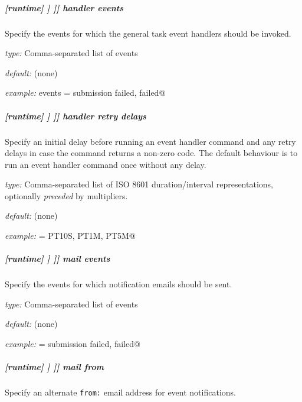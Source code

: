 \subparagraph[handler events]{[runtime] \textrightarrow [[\_\_NAME\_\_]] \textrightarrow [[[events]]] \textrightarrow handler events}

Specify the events for which the general task event handlers should be invoked.

\begin{myitemize}
    \item {\em type:} Comma-separated list of events
    \item {\em default:} (none)
    \item {\em example:} \lstinline@handler events = submission failed, failed@
\end{myitemize}

\subparagraph[handler retry delays]{[runtime] \textrightarrow [[\_\_NAME\_\_]] \textrightarrow [[[events]]] \textrightarrow handler retry delays}
\label{runtime-events-handler-retry-delays}

Specify an initial delay before running an event handler command and any retry
delays in case the command returns a non-zero code. The default behaviour is to
run an event handler command once without any delay.

\begin{myitemize}
    \item {\em type:} Comma-separated list of ISO 8601 duration/interval representations, optionally {\em preceded} by multipliers.
    \item {\em default:} (none)
    \item {\em example:} \lstinline@handler = PT10S, PT1M, PT5M@
\end{myitemize}

\subparagraph[mail events]{[runtime] \textrightarrow [[\_\_NAME\_\_]] \textrightarrow [[[events]]] \textrightarrow mail events}

Specify the events for which notification emails should be sent.

\begin{myitemize}
    \item {\em type:} Comma-separated list of events
    \item {\em default:} (none)
    \item {\em example:} \lstinline@handler = submission failed, failed@
\end{myitemize}

\subparagraph[mail from]{[runtime] \textrightarrow [[\_\_NAME\_\_]] \textrightarrow [[[events]]] \textrightarrow mail from}

Specify an alternate \lstinline=from:= email address for event notifications.

